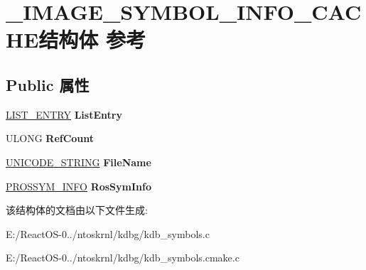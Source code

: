 \hypertarget{struct___i_m_a_g_e___s_y_m_b_o_l___i_n_f_o___c_a_c_h_e}{}\section{\+\_\+\+I\+M\+A\+G\+E\+\_\+\+S\+Y\+M\+B\+O\+L\+\_\+\+I\+N\+F\+O\+\_\+\+C\+A\+C\+H\+E结构体 参考}
\label{struct___i_m_a_g_e___s_y_m_b_o_l___i_n_f_o___c_a_c_h_e}
\subsection*{Public 属性}
\begin{DoxyCompactItemize}
\item 
\mbox{\label{struct___i_m_a_g_e___s_y_m_b_o_l___i_n_f_o___c_a_c_h_e_a7cf9498436036d2c7b5916980e21eae1}} 
\hyperlink{struct___l_i_s_t___e_n_t_r_y}{L\+I\+S\+T\+\_\+\+E\+N\+T\+RY} {\bfseries List\+Entry}
\item 
\mbox{\label{struct___i_m_a_g_e___s_y_m_b_o_l___i_n_f_o___c_a_c_h_e_a60a8af9048c990fae8c432a88725a0db}} 
U\+L\+O\+NG {\bfseries Ref\+Count}
\item 
\mbox{\label{struct___i_m_a_g_e___s_y_m_b_o_l___i_n_f_o___c_a_c_h_e_ac0b1f3e13b27ee2d8d38240b54a0b615}} 
\hyperlink{struct___u_n_i_c_o_d_e___s_t_r_i_n_g}{U\+N\+I\+C\+O\+D\+E\+\_\+\+S\+T\+R\+I\+NG} {\bfseries File\+Name}
\item 
\mbox{\label{struct___i_m_a_g_e___s_y_m_b_o_l___i_n_f_o___c_a_c_h_e_aa43ca65922906df7c93d5315f3e91afe}} 
\hyperlink{struct___r_o_s_s_y_m___i_n_f_o}{P\+R\+O\+S\+S\+Y\+M\+\_\+\+I\+N\+FO} {\bfseries Ros\+Sym\+Info}
\end{DoxyCompactItemize}


该结构体的文档由以下文件生成\+:\begin{DoxyCompactItemize}
\item 
E\+:/\+React\+O\+S-\/0../ntoskrnl/kdbg/kdb\+\_\+symbols.\+c\item 
E\+:/\+React\+O\+S-\/0../ntoskrnl/kdbg/kdb\+\_\+symbols.\+cmake.\+c\end{DoxyCompactItemize}
